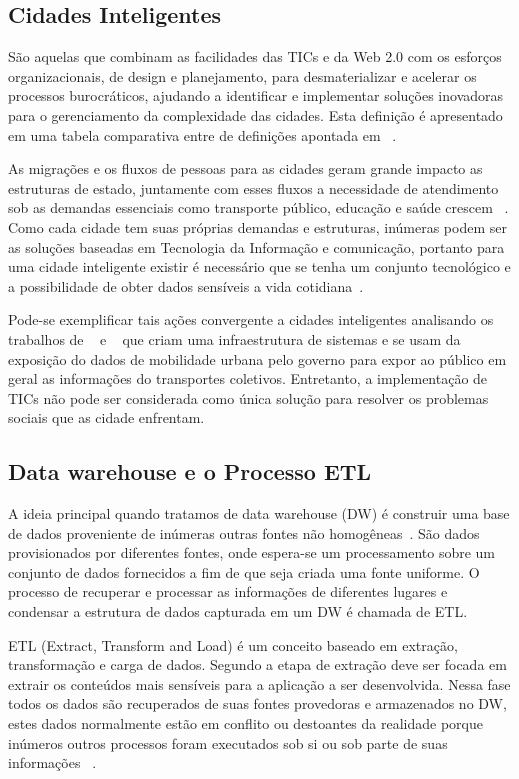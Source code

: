 \documentclass[12pt]{article}
\begin{document}
\subsection{Cidades Inteligentes}
São aquelas que combinam as facilidades das TICs e da Web 2.0 com os esforços organizacionais, de design e planejamento, para desmaterializar e acelerar os processos burocráticos, ajudando a identificar e implementar soluções inovadoras para o gerenciamento da complexidade das cidades. Esta definição é apresentado em uma tabela comparativa entre de definições apontada em  ~\cite{art12}.

As migrações e os fluxos de pessoas para as cidades geram grande impacto as estruturas de estado, juntamente com esses fluxos a necessidade de atendimento sob as demandas essenciais como transporte público, educação e saúde crescem ~\cite{art13}. Como cada cidade tem suas próprias demandas e estruturas, inúmeras podem ser as soluções baseadas em Tecnologia da Informação e comunicação, portanto para uma cidade inteligente existir é necessário que se tenha um conjunto tecnológico e a possibilidade de obter dados sensíveis a vida cotidiana~\cite{art12}.

Pode-se exemplificar tais ações convergente a cidades inteligentes analisando os trabalhos de ~\cite{art01} e ~\cite{art02} que criam uma infraestrutura de sistemas e se usam da exposição do dados de mobilidade urbana pelo governo para expor ao público em geral as informações do transportes coletivos. Entretanto, a implementação de TICs não pode ser considerada como única solução para resolver os problemas sociais que as cidade enfrentam.

\subsection{Data warehouse e o Processo ETL}\label{sec:ETLRev}
A ideia principal quando tratamos de data warehouse (DW) é construir uma base de dados proveniente de inúmeras outras fontes não homogêneas~\cite{art08}. São dados provisionados por diferentes fontes, onde espera-se um processamento sobre um conjunto de dados fornecidos a fim de que seja criada uma fonte uniforme. O processo de recuperar e processar as informações de diferentes lugares e condensar a estrutura de dados capturada em um DW é chamada de ETL. 

ETL (Extract, Transform and Load) é um conceito baseado em extração, transformação e carga de dados.  Segundo \cite{art04} a etapa de extração deve ser focada em extrair os conteúdos mais sensíveis para a aplicação a ser desenvolvida. Nessa fase todos os dados são recuperados de suas fontes provedoras e armazenados no DW, estes dados normalmente estão em conflito ou destoantes da realidade porque inúmeros outros processos foram executados sob si ou sob parte de suas informações ~\cite{art09}.
\end{document}
